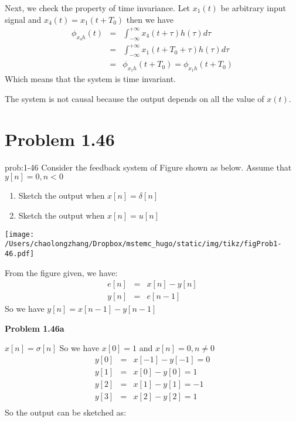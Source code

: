 \documentclass[koma,a4paper,utopia,12pt,listings-color,microtype,paralist,colorlinks,urlcolor=red]{org-article}
\begin{document}
Next, we check the property of time invariance.
Let \(x_{1}(t)\) be arbitrary input signal and \(x_{4}(t) = x_{1}(t+T_{0})\)
then we have
\begin{eqnarray*}
\phi_{x_{4}h}(t) &=& \int_{-\infty}^{+\infty} x_{4}(t+\tau) h(\tau) d\tau \\
&=& \int_{-\infty}^{+\infty} x_{1}(t+T_{0}+\tau) h(\tau) d\tau \\
&=& \phi_{x_{1}h}(t+T_{0}) = \phi_{x_{1}h}(t+T_{0})
\end{eqnarray*}
Which means that the system is time invariant.

The system is not causal because the output depends on all the value of \(x(t)\).
\section{Problem 1.46}
\label{sec:org34ba874}


\begin{prob}[]{prob:1-46}
Consider the feedback system of Figure shown as below. Assume that \(y[n] =
    0, n<0\)

\begin{enumerate}
\item Sketch the output when \(x[n] = \delta[n]\)
\item Sketch the output when \(x[n] = u[n]\)
\end{enumerate}

\begin{center}
\texttt{[image: /Users/chaolongzhang/Dropbox/mstemc\_hugo/static/img/tikz/figProb1-46.pdf]}
\end{center}
\label{prob:1-46}
\end{prob}

From the figure given, we have:
\begin{eqnarray*}
e[n]&=& x[n] - y[n] \\
y[n] &=& e[n-1]
\end{eqnarray*}
So we have \(y[n] = x[n-1] - y[n-1]\)


\textbf{Problem 1.46a}

\(x[n] = \sigma[n]\) So  we have \(x[0] = 1\) and \(x[n] = 0, n\neq 0\)
\begin{eqnarray*}
y[0]&=& x[-1] - y[-1] = 0 \\
y[1]&=& x[0] - y[0] = 1 \\
y[2]&=& x[1] - y[1] = -1 \\
y[3]&=& x[2] - y[2] = 1 \\
\end{eqnarray*}
So the output can be sketched as:
\end{document}
